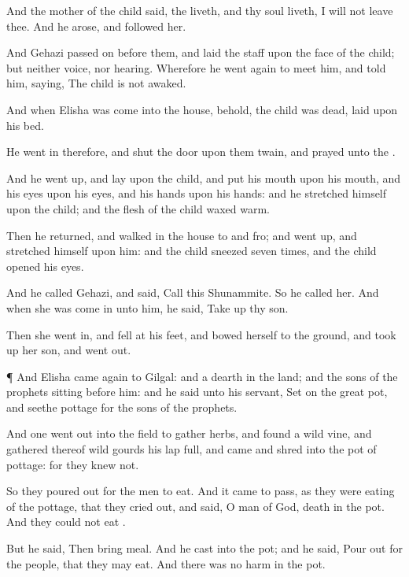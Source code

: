 {And the
mother of the
child
said,
{} the
{}
liveth, and
{} thy
soul
liveth, I will not
leave thee. And he
arose, and
followed her.

And
Gehazi passed
on
before them, and
laid the
staff upon the
face of the
child; but
{} neither
voice, nor
hearing. Wherefore he went
again to
meet him, and
told him,
saying, The
child is not
awaked.

And when
Elisha was
come into the
house, behold, the
child was
dead,
{}
laid upon his
bed.

He went
in therefore, and
shut the
door upon them
twain, and
prayed unto the
{}.

And he went
up, and
lay upon the
child, and
put his
mouth upon his
mouth, and his
eyes upon his
eyes, and his
hands upon his
hands: and he
stretched himself upon the child; and the
flesh of the
child waxed
warm.

Then he
returned, and
walked in the
house
to and
fro; and went
up, and
stretched himself upon him: and the
child
sneezed
seven
times, and the
child
opened his
eyes.

And he
called
Gehazi, and
said,
Call this
Shunammite. So he
called her. And when she was come
in unto him, he
said, Take
up thy
son.

Then she went
in, and
fell at his
feet, and
bowed herself to the
ground, and took
up her
son, and went
out.


\par }{\PP {}¶ And
Elisha came
again to
Gilgal: and
{} a
dearth in the
land; and the
sons of the
prophets
{}
sitting
before him: and he
said unto his
servant,
Set on the
great
pot, and
seethe
pottage for the
sons of the
prophets.

And
one went
out into the
field to
gather
herbs, and
found a
wild
vine, and
gathered thereof
wild
gourds his
lap
full, and
came and
shred
{} into the
pot of
pottage: for they
knew
{} not.

So they poured
out for the
men to
eat. And it came to pass, as they were
eating of the
pottage, that they cried
out, and
said, O
{}
man of
God,
{}
death in the
pot. And they
could not
eat
{}.

But he
said, Then
bring
meal. And he
cast
{} into the
pot; and he
said, Pour
out for the
people, that they may
eat. And there was no
harm in the
pot.


}

